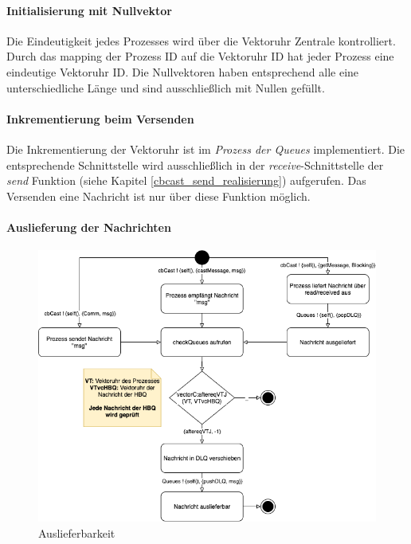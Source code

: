 \paragraph{Initialisierung mit Nullvektor}

Die Eindeutigkeit jedes Prozesses wird über die Vektoruhr Zentrale kontrolliert. Durch das mapping der Prozess ID auf die Vektoruhr ID hat jeder Prozess eine eindeutige Vektoruhr ID. Die Nullvektoren haben entsprechend alle eine unterschiedliche Länge und sind ausschließlich mit Nullen gefüllt.

\paragraph{Inkrementierung beim Versenden}

Die Inkrementierung der Vektoruhr ist im \textit{Prozess der Queues} implementiert. Die entsprechende Schnittstelle wird ausschließlich in der \textit{receive}-Schnittstelle der \textit{send} Funktion (siehe Kapitel \ref{cbcast_send_realisierung}) aufgerufen. Das Versenden eine Nachricht ist nur über diese Funktion möglich.

\paragraph{Auslieferung der Nachrichten}

\begin{figure}[htbp]
\begin{center}
\includegraphics[scale=0.55]{Latex/Bilder/Auslieferbarkeit.png}
\caption{\label{auslieferbarkeit_analyse} Auslieferbarkeit}
\end{center}
\end{figure}


